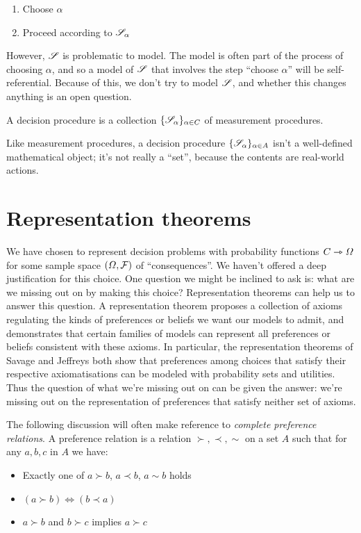 \begin{enumerate}
    \item Choose $\alpha$
    \item Proceed according to $\mathscr{S}_\alpha$
\end{enumerate}

However, $\mathscr{S}$ is problematic to model. The model is often part of the process of choosing $\alpha$, and so a model of $\mathscr{S}$ that involves the step ``choose $\alpha$'' will be self-referential. Because of this, we don't try to model $\mathscr{S}$, and whether this changes anything is an open question.

\begin{definition}
A decision procedure is a collection $\{\mathscr{S}_\alpha\}_{\alpha\in C}$ of measurement procedures.
\end{definition}

Like measurement procedures, a decision procedure $\{\mathscr{S}_\alpha\}_{\alpha\in A}$ isn't a well-defined mathematical object; it's not really a ``set'', because the contents are real-world actions.

\section{Representation theorems}\label{sec:how_represent_conseqeunces}

We have chosen to represent decision problems with probability functions $C\rightarrowtriangle \Omega$ for some sample space $(\Omega,\mathcal{F})$ of ``consequences''. We haven't offered a deep justification for this choice. One question we might be inclined to ask is: what are we missing out on by making this choice? Representation theorems can help us to answer this question. A representation theorem proposes a collection of axioms regulating the kinds of preferences or beliefs we want our models to admit, and demonstrates that certain families of models can represent all preferences or beliefs consistent with these axioms. In particular, the representation theorems of Savage and Jeffreys both show that preferences among choices that satisfy their respective axiomatisations can be modeled with probability sets and utilities. Thus the question of what we're missing out on can be given the answer: we're missing out on the representation of preferences that satisfy neither set of axioms.

The following discussion will often make reference to \emph{complete preference relations}. A preference relation is a relation $\succ,\prec,\sim$ on a set $A$ such that for any $a,b,c$ in $A$ we have:
\begin{itemize}
    \item Exactly one of $a\succ b$, $a\prec b$, $a\sim b$ holds
    \item $(a\succ b)\iff(b\prec a)$
    \item $a\succ b$ and $b\succ c$ implies $a\succ c$
\end{itemize}

